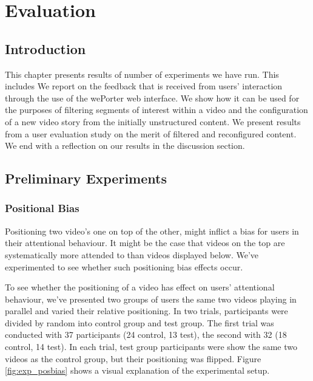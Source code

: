 \chapter{Evaluation}
\label{ch:evaluation}

\section{Introduction} %
\label{sec:introduction}

This chapter presents results of number of experiments we have run. This includes 
We report on the feedback that is received from users' interaction through the use of the wePorter web interface. We show how it can be used for the purposes of filtering segments of interest within a video and the configuration of a new video story from the initially unstructured content. We present results from a user evaluation study on the merit of filtered and reconfigured content. We end with a reflection on our results in the discussion section.


\section{Preliminary Experiments}
\label{sec:preliminary_experiments}

\subsection{Positional Bias}
Positioning two video's one on top of the other, might inflict a bias for users in their attentional behaviour. It might be the case that videos on the top are systematically more attended to than videos displayed below. We've experimented to see whether such positioning bias effects occur.

To see whether the positioning of a video has effect on users' attentional behaviour, we've presented two groups of users the same two videos playing in parallel and varied their relative positioning. In two trials, participants were divided by random into control group and test group. The first trial was conducted with 37 participants (24 control, 13 test), the second with 32 (18 control, 14 test). In each trial, test group participants were show the same two videos as the control group, but their positioning was flipped. Figure \ref{fig:exp_posbias} shows a visual explanation of the experimental setup.

